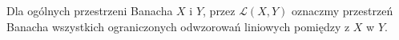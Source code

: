 Dla ogólnych przestrzeni Banacha $X$ i $Y$, przez
$\mathcal{L}(X,Y)$
oznaczmy przestrzeń Banacha wszystkich ograniczonych odwzorowań
liniowych pomiędzy z $X$ w $Y$.

% 



%
% 
% 
% 
